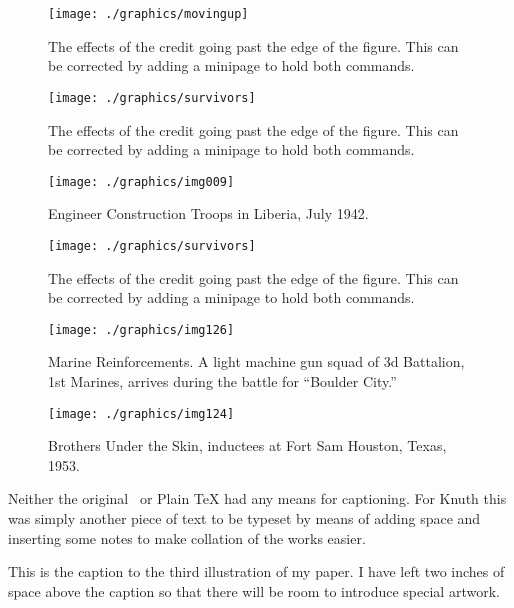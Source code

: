 \newpage
\pagestyle{empty}
\thispagestyle{empty}
\begin{figure}[htp]
\centering

\captionsetup{figurename=Photo., labelsep=period}%
   \begin{minipage}[t]{0.48\textwidth}
      \texttt{[image: ./graphics/movingup]}%
     \caption{The effects of the credit going past the edge of the figure. This can be corrected by adding a minipage to hold both commands. }
\end{minipage}\hfill\hfill
\begin{minipage}[t]{0.48\textwidth}
      \texttt{[image: ./graphics/survivors]}%
     \caption{The effects of the credit going past the edge of the figure. This can be corrected by adding a minipage to hold both commands. }
\end{minipage}

 \begin{minipage}[t]{0.48\textwidth}
      \texttt{[image: ./graphics/img009]}%
     \caption{Engineer Construction Troops in Liberia, July 1942.}
\end{minipage}\hfill\hfill
\begin{minipage}[t]{0.48\textwidth}
      \texttt{[image: ./graphics/survivors]}%
     \caption{The effects of the credit going past the edge of the figure. This can be corrected by adding a minipage to hold both commands. }
\end{minipage}
 \begin{minipage}[t]{0.48\textwidth}
      \texttt{[image: ./graphics/img126]}%
     \caption{Marine Reinforcements.
A light machine gun squad of 3d Battalion, 1st Marines, arrives during the battle for ``Boulder City.'' }
\end{minipage}\hfill\hfill
\begin{minipage}[t]{0.48\textwidth}
      \texttt{[image: ./graphics/img124]}%
     \caption{Brothers Under the Skin, inductees at Fort Sam Houston, Texas, 1953. }
\end{minipage}
\end{figure}
\newpage

Neither the original \tex\ or Plain TeX had any means for captioning. For Knuth this was simply another piece of text to be typeset by means of adding space and inserting some notes to make collation of the works easier.

\begin{Code}
{\vskip 2in
\hsize=3in \raggedright
{} This is the caption to the
third illustration of my paper. I have left two inches
of space above the caption so that there will be room
to introduce special artwork.}
\end{Code}
\relax
\endinput